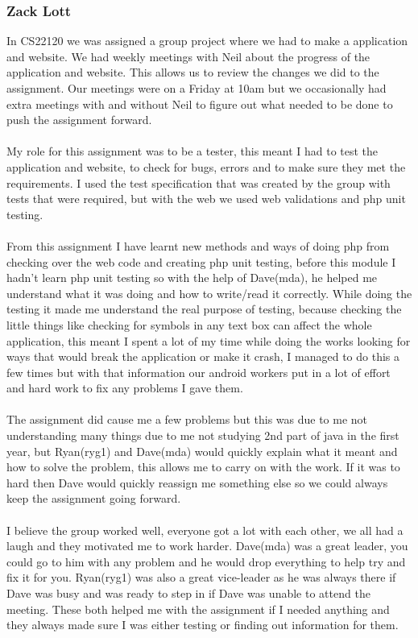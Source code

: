 \documentclass[12pt, portrait]{article}
\begin{document}
\subsubsection{Zack Lott}
In CS22120 we was assigned a group project where we had to make a application and website.
We had weekly meetings with Neil about the progress of the application and website. This allows us to review the changes we did to the assignment. Our meetings were on a Friday at 10am but we occasionally had extra meetings with and without Neil to figure out what needed to be done to push the assignment forward. 
~\\\\
My role for this assignment was to be a tester, this meant I had to test the application and website, to check for bugs, errors and to make sure they met the requirements. I used the test specification that was created by the group with tests that were required, but with the web we used web validations and php unit testing.
~\\\\
From this assignment I have learnt new methods and ways of doing php from checking over the web code and creating php unit testing, before this module I hadn't learn php unit testing so with the help of Dave(mda), he helped me understand what it was doing and how to write/read it correctly. While doing the testing it made me understand the real purpose of testing, because checking the little things like checking for symbols in any text box can affect the whole application, this meant I spent a lot of my time while doing the works looking for ways that would break the application or make it crash, I managed to do this a few times but with that information our android workers put in a lot of effort and hard work to fix any problems I gave them.
~\\\\
The assignment did cause me a few problems but this was due to me not understanding many things due to me not studying 2nd part of java in the first year, but Ryan(ryg1) and Dave(mda) would quickly explain what it meant and how to solve the problem, this allows me to carry on with the work. If it was to hard then Dave would quickly reassign me something else so we could always keep the assignment going forward.  
~\\\\
I believe the group worked well, everyone got a lot with each other, we all had a laugh and they motivated me to work harder. Dave(mda) was a great leader, you could go to him with any problem and he would drop everything to help try and fix it for you. Ryan(ryg1) was also a great vice-leader as he was always there if Dave was busy and was ready to step in if Dave was unable to attend the meeting. These both helped me with the assignment if I needed anything and they always made sure I was either testing or finding out information for them. 
\end{document}
